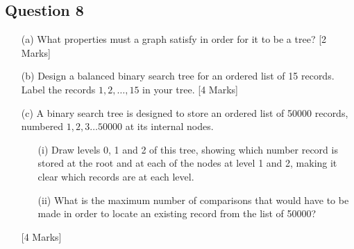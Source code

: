 \subsection*{Question 8}
\begin{itemize}

\item[(a)] What properties must a graph satisfy in order for it to be a tree? [2 Marks]
\item[(b)] Design a balanced binary search tree for an ordered list of 15 records.
Label the records $1,2, \ldots , 15$ in your tree. [4 Marks]

\item[(c)] A binary search tree is designed to store an ordered list of 50000 records,
numbered $1,2,3\ldots 50000$ at its internal nodes.
\begin{itemize}
\item[(i)] Draw levels 0, 1 and 2 of this tree, showing which number record is stored
at the root and at each of the nodes at level 1 and 2, making it clear
which records are at each level.
\item[(ii)] What is the maximum number of comparisons that would have to be
made in order to locate an existing record from the list of 50000? 
\end{itemize}
[4 Marks]
\end{itemize}

